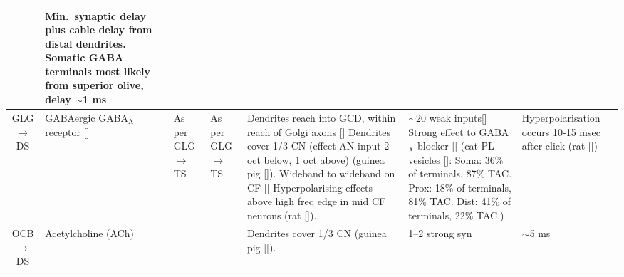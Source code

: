 \begin{longtable}{cYYYYYY}
& %
Min.\ synaptic delay plus cable delay from distal dendrites.
Somatic GABA terminals most likely from superior olive, delay $\sim$1 ms
\\ \midrule
GLG\ensuremath{\rightarrow}DS                         
& %
{GABAergic} {GABA$_{\textrm{A}}$} receptor []
& %
As per GLG\ensuremath{\rightarrow}TS
& %
As per GLG\ensuremath{\rightarrow}TS
& %
Dendrites reach into GCD, within reach of Golgi axons []     
Dendrites cover 1/3 CN (effect AN input 2 oct below, 1 oct above) (guinea pig []).
Wideband to wideband on CF [] 
Hyperpolarising effects above high freq edge in mid CF neurons (rat []).                    
& %
$\sim$20 weak inputs[]
Strong effect to {GABA$_{\textrm{A}}$} blocker  []
(cat PL vesicles []:
Soma: 36\% of terminals, 87\% TAC. 
Prox: 18\% of terminals, 81\% TAC. 
Dist: 41\% of terminals, 22\% TAC.)
& %
Hyperpolarisation occurs 10-15 msec after click (rat [])
\\ \midrule

OCB$\rightarrow$DS
& Acetylcholine (ACh)
& 
&
& Dendrites cover 1/3 CN (guinea pig []).
& 1--2 strong syn \citep{MuldersPaoliniEtAl:2009,HorvathKrausEtAl:2000,MuldersPaoliniEtAl:2003}
& $\sim$5 ms \citep{MuldersPaoliniEtAl:2009}\\
\end{longtable}





